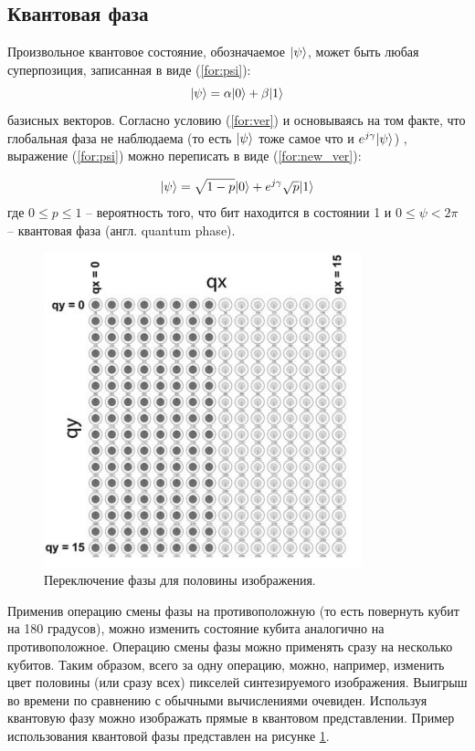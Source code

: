 \subsection{Квантовая фаза} \label{qphase}

Произвольное квантовое состояние, обозначаемое $\lvert\psi\rangle$, может быть любая суперпозиция, записанная в виде (\ref{for:psi}):
\begin{equation}
	\label{for:psi}
	\lvert\psi\rangle = \alpha\lvert0\rangle + \beta\lvert1\rangle
\end{equation}
 базисных векторов. Согласно условию (\ref{for:ver}) и основываясь на том факте, что глобальная фаза не наблюдаема (то есть $\lvert\psi\rangle$ тоже самое что и $e^{j\gamma}\lvert\psi\rangle$) \cite{global-phase}, выражение (\ref{for:psi}) можно переписать в виде (\ref{for:new_ver}):
 
\begin{equation} 
	\label{for:new_ver}
	\lvert\psi\rangle = \sqrt{1 - p}\lvert0\rangle + e^{j\gamma}\sqrt{p}\lvert1\rangle
\end{equation} где $0 \leq p \leq 1$ -- вероятность того, что бит находится в состоянии 1 и $0 \leq \psi < 2\pi$ -- квантовая фаза (англ. quantum phase).

\begin{figure}[H]
	\begin{center}
		\includegraphics[scale=0.7]{img/holst_02.png}
	\end{center}
	\captionsetup{justification=centering}
	\caption{Переключение фазы для половины изображения.}
	\label{img:holst_02}
\end{figure}

Применив операцию смены фазы на противоположную (то есть повернуть кубит на 180 градусов), можно изменить состояние кубита аналогично на противоположное. Операцию смены фазы можно применять сразу на несколько кубитов. Таким образом, всего за одну операцию, можно, например, изменить цвет половины (или сразу всех) пикселей синтезируемого изображения. Выигрыш во времени по сравнению с обычными вычислениями очевиден. Используя квантовую фазу можно изображать прямые в квантовом представлении. Пример использования квантовой фазы представлен на рисунке \ref{img:holst_02}.

